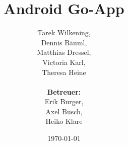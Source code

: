 \documentclass[parskip=full]{scrartcl}
\begin{document}
\title{Android Go-App}
\author{Tarek Wilkening, \\Dennis Bäuml, \\Matthias Dressel, \\Victoria Karl, \\Theresa Heine\\
	\\\textbf{Betreuer:} \\
		Erik Burger, \\
		Axel Busch, \\
		Heiko Klare \\
				}
\date{\today}
\maketitle
\newpage
\tableofcontents
\newpage


\newpage

\newpage

\newpage

\newpage

\newpage

\newpage

\newpage

\newpage

\newpage

\newpage

\newpage

\newpage

\end{document}
